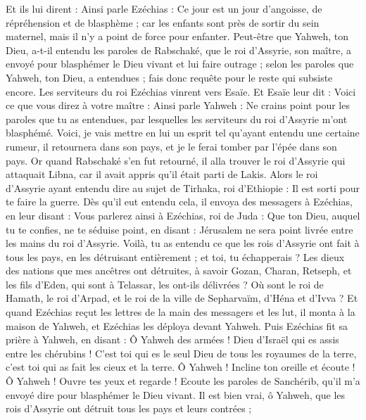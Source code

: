 \begin{multicols}{2}
Et ils lui dirent : Ainsi parle Ezéchias : Ce jour est un jour d'angoisse, de répréhension et de blasphème ; car les enfants sont près de sortir du sein maternel, mais il n'y a point de force pour enfanter.
Peut-être que Yahweh, ton Dieu, a-t-il entendu les paroles de Rabschaké, que le roi d'Assyrie, son maître, a envoyé pour blasphémer le Dieu vivant et lui faire outrage ; selon les paroles que Yahweh, ton Dieu, a entendues ; fais donc requête pour le reste qui subsiste encore.
Les serviteurs du roi Ezéchias vinrent vers Esaïe.
Et Esaïe leur dit : Voici ce que vous direz à votre maître : Ainsi parle Yahweh : Ne crains point pour les paroles que tu as entendues, par lesquelles les serviteurs du roi d'Assyrie m'ont blasphémé.
Voici, je vais mettre en lui un esprit tel qu'ayant entendu une certaine rumeur, il retournera dans son pays, et je le ferai tomber par l'épée dans son pays.
Or quand Rabschaké s'en fut retourné, il alla trouver le roi d'Assyrie qui attaquait Libna, car il avait appris qu'il était parti de Lakis.
Alors le roi d'Assyrie ayant entendu dire au sujet de Tirhaka, roi d'Ethiopie : Il est sorti pour te faire la guerre. Dès qu'il eut entendu cela, il envoya des messagers à Ezéchias, en leur disant :
Vous parlerez ainsi à Ezéchias, roi de Juda : Que ton Dieu, auquel tu te confies, ne te séduise point, en disant : Jérusalem ne sera point livrée entre les mains du roi d'Assyrie.
Voilà, tu as entendu ce que les rois d'Assyrie ont fait à tous les pays, en les détruisant entièrement ; et toi, tu échapperais ?
Les dieux des nations que mes ancêtres ont détruites, à savoir Gozan, Charan, Retseph, et les fils d'Eden, qui sont à Telassar, les ont-ils délivrées ?
Où sont le roi de Hamath, le roi d'Arpad, et le roi de la ville de Sepharvaïm, d'Héna et d'Ivva ?
Et quand Ezéchias reçut les lettres de la main des messagers et les lut, il monta à la maison de Yahweh, et Ezéchias les déploya devant Yahweh.
Puis Ezéchias fit sa prière à Yahweh, en disant :
Ô Yahweh des armées ! Dieu d'Israël qui es assis entre les chérubins ! C'est toi qui es le seul Dieu de tous les royaumes de la terre, c'est toi qui as fait les cieux et la terre.
Ô Yahweh ! Incline ton oreille et écoute ! Ô Yahweh ! Ouvre tes yeux et regarde ! Ecoute les paroles de Sanchérib, qu'il m'a envoyé dire pour blasphémer le Dieu vivant.
Il est bien vrai, ô Yahweh, que les rois d'Assyrie ont détruit tous les pays et leurs contrées ;

\end{multicols}
